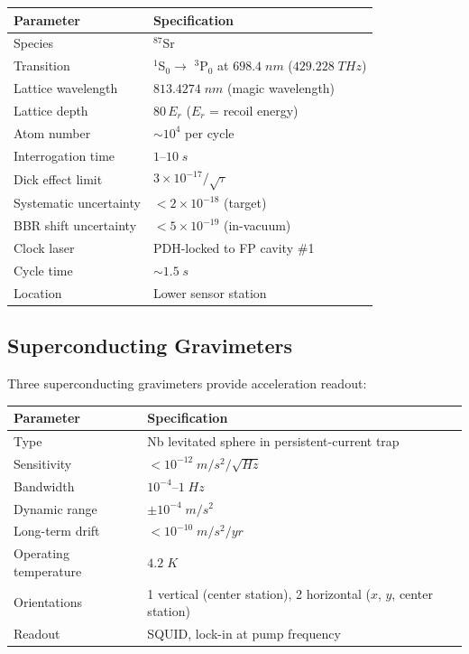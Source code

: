\documentclass[11pt,a4paper]{article}
\begin{document}
\begin{longtable}{p{}p{}}
\toprule
\textbf{Parameter} & \textbf{Specification} \\
\midrule
\endhead
Species & $^{87}$Sr \\
Transition & $^1$S$_0 \to$ $^3$P$_0$ at $698.4\;\si{nm}$
($429.228\;\si{THz}$) \\
Lattice wavelength & $813.4274\;\si{nm}$ (magic wavelength) \\
Lattice depth & $80\,E_r$ ($E_r$ = recoil energy) \\
Atom number & $\sim 10^4$ per cycle \\
Interrogation time & $1$--$10\;\si{s}$ \\
Dick effect limit & $3 \times 10^{-17}/\sqrt{\tau}$ \\
Systematic uncertainty & $< 2 \times 10^{-18}$ (target) \\
BBR shift uncertainty & $< 5 \times 10^{-19}$ (in-vacuum) \\
Clock laser & PDH-locked to FP cavity \#1 \\
Cycle time & $\sim 1.5\;\si{s}$ \\
Location & Lower sensor station \\
\bottomrule
\end{longtable}

\subsection{Superconducting Gravimeters}

Three superconducting gravimeters provide acceleration readout:

\begin{longtable}{p{}p{}}
\toprule
\textbf{Parameter} & \textbf{Specification} \\
\midrule
\endhead
Type & Nb levitated sphere in persistent-current trap \\
Sensitivity & $< 10^{-12}\;\si{m/s^2/\sqrt{Hz}}$ \\
Bandwidth & $10^{-4}$--$1\;\si{Hz}$ \\
Dynamic range & $\pm 10^{-4}\;\si{m/s^2}$ \\
Long-term drift & $< 10^{-10}\;\si{m/s^2/yr}$ \\
Operating temperature & $4.2\;\si{K}$ \\
Orientations & 1 vertical (center station), 2 horizontal
($x$, $y$, center station) \\
Readout & SQUID, lock-in at pump frequency \\
\bottomrule
\end{longtable}
\end{document}
